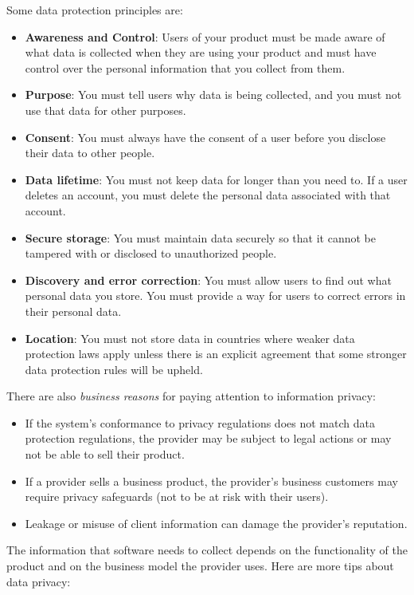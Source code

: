 \noindent Some data protection principles are:
\begin{itemize}
    \item \textbf{Awareness and Control}: Users of your product must be made aware of what data is collected when they are using your product and must have control over the personal information that you collect from them.
    \item \textbf{Purpose}: You must tell users why data is being collected, and you must not use that data for other purposes.
    \item \textbf{Consent}: You must always have the consent of a user before you disclose their data to other people.
    \item \textbf{Data lifetime}: You must not keep data for longer than you need to. If a user deletes an account, you must delete the personal data associated with that account.
    \item \textbf{Secure storage}: You must maintain data securely so that it cannot be tampered with or disclosed to unauthorized people.
    \item \textbf{Discovery and error correction}: You must allow users to find out what personal data you store. You must provide a way for users to correct errors in their personal data.
    \item \textbf{Location}: You must not store data in countries where weaker data protection laws apply unless there is an explicit agreement that some stronger data protection rules will be upheld. 
\end{itemize}

\noindent There are also \textit{business reasons} for paying attention to information privacy:

\begin{itemize}
	\item If the system's conformance to privacy regulations does not match data protection regulations, the provider may be subject to legal actions or may not be able to sell their product.
	\item If a provider sells a business product, the provider's business customers may require privacy safeguards (not to be at risk with their users).
	\item Leakage or misuse of client information can damage the provider's reputation.
\end{itemize}

\noindent The information that software needs to collect depends on the functionality of the product and on the business model the provider uses. Here are more tips about data privacy:

